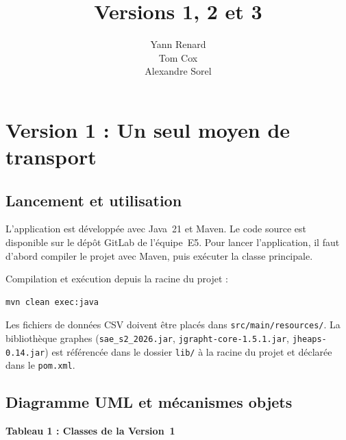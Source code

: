 \documentclass[fontsize=10pt,oneside,parskip=half]{scrreprt}
\title{Versions 1, 2 et 3}
\author{Yann Renard \\ Tom Cox \\ Alexandre Sorel}
\newcommand{\ic}[1]{{\setlength{\fboxsep}{2pt}\colorbox{BeigeSerein}{\texttt{#1}}}}
\begin{document}

\maketitle
\pagecolor{Blanc}
{%
  \setlength{\parskip}{0pt}%
  \tableofcontents%
}

\chapter{Version 1 : Un seul moyen de transport}

\section{Lancement et utilisation}

L'application est développée avec Java~21 et Maven. Le code source est disponible
sur le dépôt GitLab de l'équipe~E5. Pour lancer l'application, il faut d'abord
compiler le projet avec Maven, puis exécuter la classe principale.

Compilation et exécution depuis la racine du projet :

\begin{lstlisting}[style=bash]
mvn clean exec:java
\end{lstlisting}

Les fichiers de données CSV doivent être placés dans \ic{src/main/resources/}.
La bibliothèque graphes (\ic{sae\_s2\_2026.jar}, \ic{jgrapht-core-1.5.1.jar},
\ic{jheaps-0.14.jar}) est référencée dans le dossier \ic{lib/} à la racine du
projet et déclarée dans le \ic{pom.xml}.

\section{Diagramme UML et mécanismes objets}

\noindent\textbf{Tableau 1 : Classes de la Version~1}
\end{document}
